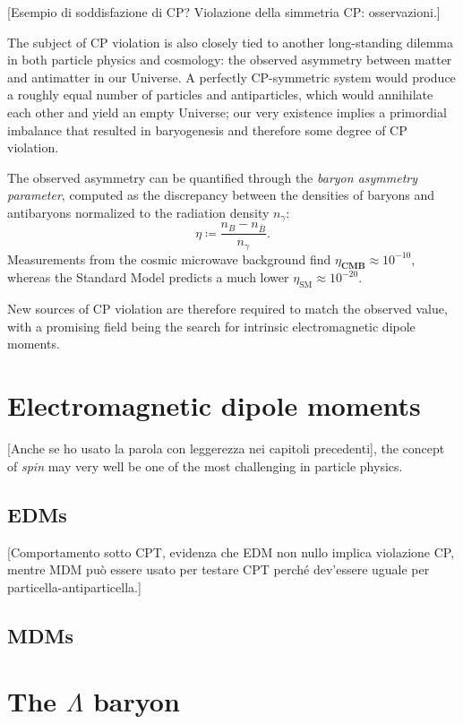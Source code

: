 [Esempio di soddisfazione di CP? Violazione della simmetria CP: osservazioni.]

The subject of CP violation is also closely tied to another long-standing dilemma in both particle physics and cosmology: the observed asymmetry between matter and antimatter in our Universe.
A perfectly CP-symmetric system would produce a roughly equal number of particles and antiparticles, which would annihilate each other and yield an empty Universe; our very existence implies a primordial imbalance that resulted in baryogenesis and therefore some degree of CP violation.

The observed asymmetry can be quantified through the \textit{baryon asymmetry parameter}, computed as the discrepancy between the densities of baryons and antibaryons normalized to the radiation density $n_\gamma$:
\begin{equation}
\eta \coloneqq \frac{n_B - n_{\bar{B}}}{n_\gamma}.
\end{equation}
Measurements from the cosmic microwave background
find $\eta_\textbf{CMB} \approx {10}^{-10}$, whereas the Standard Model predicts a much lower $\eta_\text{SM} \approx {10}^{-20}$.

New sources of CP violation are therefore required to match the observed value, with a promising field being the search for intrinsic electromagnetic dipole moments.

\section{Electromagnetic dipole moments}
\label{sec:edms}

[Anche se ho usato la parola con leggerezza nei capitoli precedenti], the concept of \textit{spin} may very well be one of the most challenging in particle physics.

\subsection{EDMs}

[Comportamento sotto CPT, evidenza che EDM non nullo implica violazione CP, mentre MDM può essere usato per testare CPT perché dev'essere uguale per particella-antiparticella.]

\subsection{MDMs}

\section{The \texorpdfstring{$\Lambda$}{Lambda} baryon}
\label{sec:lambda}

